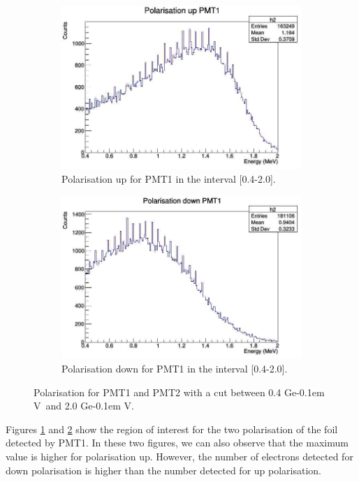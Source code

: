 \documentclass[10pt,swedish, openany]{book}
\def\MeV{\ifmmode {\mathrm{\ Me\kern -0.1em V}}\else
                   \textrm{Ge\kern -0.1em V}\fi}%
\begin{document}
\begin{figure}[H]
\begin{subfigure}{.5\textwidth}
  \centering
  \includegraphics[width=.8\linewidth]{upPMT1cut.jpg}  
  \caption{Polarisation up for PMT1 in the interval [0.4-2.0].}
  \label{fig:upcut}
\end{subfigure}
\begin{subfigure}{.5\textwidth}
  \centering
  \includegraphics[width=.8\linewidth]{downPMT1cut.jpg}  
  \caption{Polarisation down for PMT1 in the interval [0.4-2.0].}
  \label{fig:downcut}
\end{subfigure}
\caption{Polarisation for PMT1 and PMT2 with a cut between 0.4 \MeV~and 2.0 \MeV.}
\label{fig:fig}
\end{figure}

Figures \ref{fig:upcut} and \ref{fig:downcut} show the region of interest for the two polarisation of the foil detected by PMT1. In these two figures, we can also observe that the maximum value is higher for polarisation up. However, the number of electrons detected for down polarisation is higher than the number detected for up polarisation.\\
\end{document}
